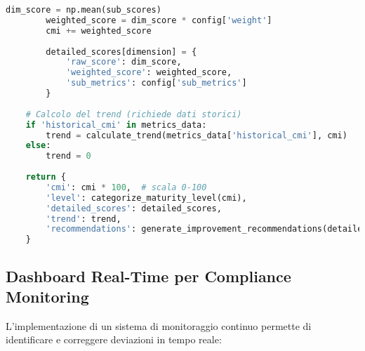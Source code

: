 \begin{lstlisting}[language=Python, caption=Calcolo Compliance Maturity Index]
        dim_score = np.mean(sub_scores)
        weighted_score = dim_score * config['weight']
        cmi += weighted_score
        
        detailed_scores[dimension] = {
            'raw_score': dim_score,
            'weighted_score': weighted_score,
            'sub_metrics': config['sub_metrics']
        }
        
    # Calcolo del trend (richiede dati storici)
    if 'historical_cmi' in metrics_data:
        trend = calculate_trend(metrics_data['historical_cmi'], cmi)
    else:
        trend = 0
        
    return {
        'cmi': cmi * 100,  # scala 0-100
        'level': categorize_maturity_level(cmi),
        'detailed_scores': detailed_scores,
        'trend': trend,
        'recommendations': generate_improvement_recommendations(detailed_scores)
    }
\end{lstlisting}

\subsection{Dashboard Real-Time per Compliance Monitoring}

L'implementazione di un sistema di monitoraggio continuo permette di identificare e correggere deviazioni in tempo reale:

